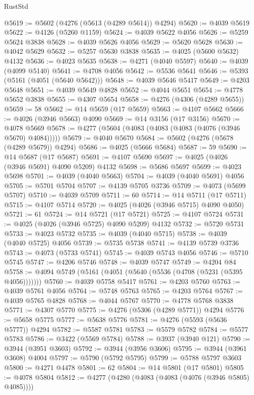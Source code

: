 \begin{lexlean}{RustStd}
\begin{coremodule}
@5619 := @5602 (@4276 (@5613 (@4289 @5614)) @4294)
@5620 := @4039 @5619
@5622 := @4126 (@5260 @1159)
@5624 := @4039 @5622 @4056
@5626 := @5259 @5624 @3838
@5628 := @4039 @5626 @4056
@5629 := @5620 @5628
@5630 := @4042 @5629
@5632 := @5257 @5630 @3838
@5635 := @4025 (@5600 @5632) @4132
@5636 := @4023 @5635
@5638 := @4271 (@4040 @5597)
@5640 := @4039 (@4099 @5140)
@5641 := @4708 @4056
@5642 := @5536 @5641
@5646 := @5393 (@5161 (@4051 (@5640 @5642)))
@5648 := @4039 @5646 @5417
@5649 := @4203 @5648
@5651 := @4039 @5649 @4828
@5652 := @4044 @5651
@5654 := @4778 @5652 @3838
@5655 := @4307 @5654
@5658 := @4276 (@4306 (@4289 @5655))
@5659 := 58
@5662 := @14 @5659 (@17 @5659)
@5663 := @4107 @5662
@5666 := @4026 (@3946 @5663) @4090
@5669 := @14 @3156 (@17 @3156)
@5670 := @4078 @5669
@5678 := @4277 (@5604 (@4083 (@4083 (@4083 (@4076 (@3946 @5670) @4084)))))
@5679 := @4040 @5670
@5684 := @5602 (@4276 (@5678 (@4289 @5679)) @4294)
@5686 := @4025 (@5666 @5684)
@5687 := 59
@5690 := @14 @5687 (@17 @5687)
@5691 := @4107 @5690
@5697 := @4025 (@4026 (@3946 @5691) @4090 @5209) @4132
@5698 := @5686 @5697
@5699 := @4023 @5698
@5701 := @4039 (@4040 @5663)
@5704 := @4039 (@4040 @5691) @4056
@5705 := @5701 @5704
@5707 := @4139 @5705 @3736
@5709 := @4073 (@5699 @5707)
@5710 := @4039 @5709
@5711 := 60
@5714 := @14 @5711 (@17 @5711)
@5715 := @4107 @5714
@5720 := @4025 (@4026 (@3946 @5715) @4090 @4050)
@5721 := 61
@5724 := @14 @5721 (@17 @5721)
@5725 := @4107 @5724
@5731 := @4025 (@4026 (@3946 @5725) @4090 @5209) @4132
@5732 := @5720 @5731
@5733 := @4023 @5732
@5735 := @4039 (@4040 @5715)
@5738 := @4039 (@4040 @5725) @4056
@5739 := @5735 @5738
@5741 := @4139 @5739 @3736
@5743 := @4073 (@5733 @5741)
@5745 := @4039 @5743 @4056
@5746 := @5710 @5745
@5747 := @4206 @5746
@5748 := @4039 @5747
@5749 := @4204 @84
@5758 := @4094 @5749 (@5161 (@4051 (@5640 (@5536 (@4708 (@5231 (@5395 @4056)))))))
@5760 := @4039 @5758 @5417
@5761 := @4203 @5760
@5763 := @4039 @5761 @4056
@5764 := @5748 @5763
@5765 := @4203 @5764
@5767 := @4039 @5765 @4828
@5768 := @4044 @5767
@5770 := @4778 @5768 @3838
@5771 := @4307 @5770
@5775 := @4276 (@5306 (@4289 @5771)) @4294
@5776 := @5658 @5775
@5777 := @5638 @5776
@5781 := @4276 (@5593 (@5636 @5777)) @4294
@5782 := @5587 @5781
@5783 := @5579 @5782
@5784 := @5577 @5783
@5786 := @3422 (@5569 @5784)
@5788 := @3937 (@3940 @121)
@5790 := @3944 (@3951 @3603)
@5792 := @3944 (@3956 @3606)
@5795 := @3944 (@3961 @3608) @4004
@5797 := @5790 (@5792 @5795)
@5799 := @5788 @5797 @3603
@5800 := @4271 @4478
@5801 := 62
@5804 := @14 @5801 (@17 @5801)
@5805 := @4078 @5804
@5812 := @4277 (@4280 (@4083 (@4083 (@4076 (@3946 @5805) @4085))))

\end{coremodule}
\end{lexlean}

